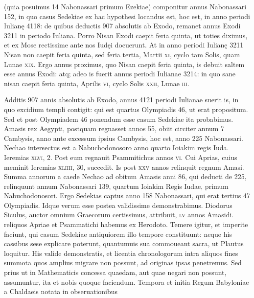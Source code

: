 (quia posuimus 14 Nabonassari primum Ezekiae) componitur
annus Nabonassari 152, in quo casus Sedekiae ex hac hypothesi
locandus est, hoc est, in anno periodi Iulianę 4118: de quibus deductis
907 absolutis ab Exodo, remanet annus Exodi 3211 in periodo Iuliana.
Porro Nisan Exodi caepit feria quinta, ut toties diximus, et ex
Mose rectissime ante nos Iudęi docuerunt.
At in anno periodi Iulianę
3211 Nisan non caepit feria quinta, sed feria tertia,
 Martii \textsc{xi}, cyclo tam
Solis, quam Lunae \textsc{xix}.
Ergo annus proximus, quo Nisan caepit feria
quinta, is debuit saltem esse annus Exodi: atq; adeo is fuerit annus periodi
Iulianae 3214: in quo sane nisan caepit feria quinta, Aprilis \textsc{vi},
cyclo Solis \textsc{xxii}, Lunae \textsc{iii}.

Additis 907 annis absolutis ab Exodo,
annus 4121 periodi Iulianae suerit is, in quo excidium templi contigit:
qui est quartus Olympiadis 46, ut erat propositum.
Sed et post
Olympiadem 46 ponendum esse casum Sedekiae ita probabimus.
Amasis rex Aegypti, postquam regnasset annos 55, obiit circiter annum
7 Cambysis, anno ante excessum ipsius Cambysis, hoc est, anno
225 Nabonassari.
Nechao intersectus est a Nabuchodonosoro anno
quarto Ioiakim regis Iuda.
Ieremias \textsc{xlvi}, 2.
Post eum regnauit
Psammitichus annos \textsc{vi}.
Cui Aprias, cuius meminit Ieremias
\textsc{xliiii}, 30, succedit.
Is post \textsc{xxv} annos relinquit regnum Amasi.
Summa annorum a caede Nechao ad obitum Amasis anni 86, qui
deducti de 225, relinquunt annum Nabonassari 139, quartum Ioiakim
Regis Iudae, primum Nabuchodonosori.
Ergo Sedekias captus
anno 158 Nabonassari, qui erat tertius 47 Olympiadis.
Idque verum
esse postea validissime demonstrabimus.
Diodorus Siculus,
auctor omnium Graecorum certissimus, attribuit, \textsc{lv} annos Amasidi.
reliquos Apriae et Psammatichi habemus ex Herodoto.
Temere
igitur, et imperite faciunt, qui casum Sedekiae antiquiorem illo
tempore constituunt: neque his cassibus sese explicare poterunt,
quantumuis sua commoueant sacra, ut Plautus loquitur.
His valide
demonstratis, et licentia chronologorum intra aliquos fines summota
quos amplius migrare non possunt, ad originas ipsas penetremus.
Sed prius ut in Mathematicis concessa quaedam, aut quae negari
non possunt, assumuntur, ita et nobis quoque faciendum.
Tempora et initia Regum Babyloniae a Chaldaeis notata in obseruationibus
